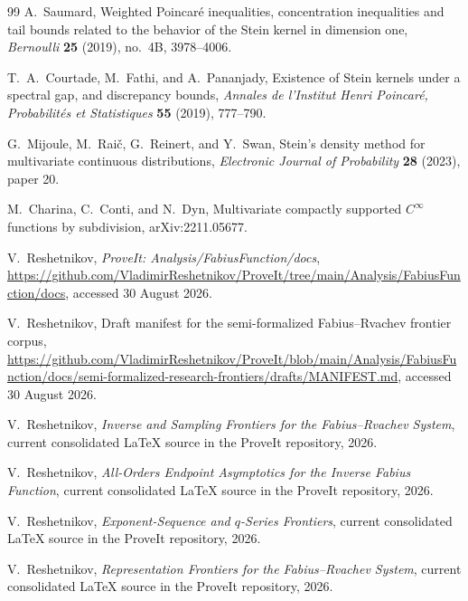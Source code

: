 \documentclass[11pt,a4paper]{article}
\theoremstyle{definition}
\theoremstyle{remark}
\begin{document}
\begin{thebibliography}{99}
A.~Saumard,
\newblock Weighted Poincar\'e inequalities, concentration inequalities and tail bounds related to the behavior of the Stein kernel in dimension one,
\newblock \emph{Bernoulli} \textbf{25} (2019), no.~4B, 3978--4006.

T.~A.~Courtade, M.~Fathi, and A.~Pananjady,
\newblock Existence of Stein kernels under a spectral gap, and discrepancy bounds,
\newblock \emph{Annales de l'Institut Henri Poincar\'e, Probabilit\'es et Statistiques} \textbf{55} (2019), 777--790.

G.~Mijoule, M.~Rai\v{c}, G.~Reinert, and Y.~Swan,
\newblock Stein's density method for multivariate continuous distributions,
\newblock \emph{Electronic Journal of Probability} \textbf{28} (2023), paper 20.

M.~Charina, C.~Conti, and N.~Dyn,
\newblock Multivariate compactly supported $C^\infty$ functions by subdivision,
\newblock arXiv:2211.05677.

V.~Reshetnikov,
\newblock \emph{ProveIt: Analysis/FabiusFunction/docs},
\newblock \url{https://github.com/VladimirReshetnikov/ProveIt/tree/main/Analysis/FabiusFunction/docs}, accessed 30 August 2026.

V.~Reshetnikov,
\newblock Draft manifest for the semi-formalized Fabius--Rvachev frontier corpus,
\newblock \url{https://github.com/VladimirReshetnikov/ProveIt/blob/main/Analysis/FabiusFunction/docs/semi-formalized-research-frontiers/drafts/MANIFEST.md}, accessed 30 August 2026.

V.~Reshetnikov,
\newblock \emph{Inverse and Sampling Frontiers for the Fabius--Rvachev System},
\newblock current consolidated LaTeX source in the ProveIt repository, 2026.

V.~Reshetnikov,
\newblock \emph{All-Orders Endpoint Asymptotics for the Inverse Fabius Function},
\newblock current consolidated LaTeX source in the ProveIt repository, 2026.

V.~Reshetnikov,
\newblock \emph{Exponent-Sequence and $q$-Series Frontiers},
\newblock current consolidated LaTeX source in the ProveIt repository, 2026.

V.~Reshetnikov,
\newblock \emph{Representation Frontiers for the Fabius--Rvachev System},
\newblock current consolidated LaTeX source in the ProveIt repository, 2026.

\end{thebibliography}
\end{document}
